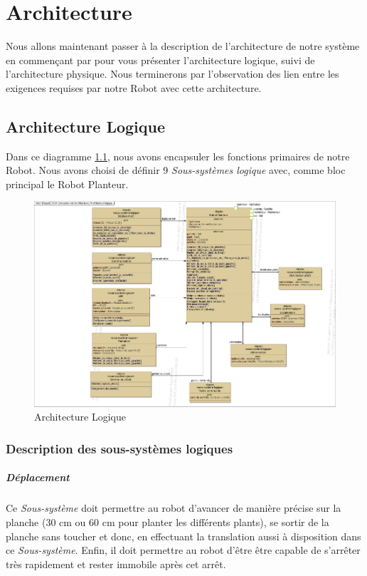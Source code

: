 \chapter{Architecture}
Nous allons maintenant passer à la description de l'architecture de notre système en commençant par pour vous présenter l’architecture logique, suivi de l'architecture physique. Nous terminerons par l'observation des lien entre les exigences requises par notre Robot avec cette architecture.

\section{Architecture Logique}
Dans ce diagramme \ref{fig:architectureLogique}, nous avons encapsuler les fonctions primaires de notre Robot. Nous avons choisi de définir 9 \emph{Sous-systèmes logique} avec, comme bloc principal le Robot Planteur.
\begin{figure}[!ht]
\centering
\includegraphics[width = \textwidth]{./III/images/SysML_Block_Definition_Diagram_3-CA_Conception_de_l_architecture_Architecture_logique.pdf}
\caption{Architecture Logique}\label{fig:architectureLogique}
\end{figure}
\subsection{Description des sous-systèmes logiques}
\paragraph*{Déplacement}
Ce \emph{Sous-système} doit permettre au robot d'avancer de manière précise sur la planche (30 cm ou 60 cm pour planter les différents plants), se sortir de la planche sans toucher et donc, en effectuant la translation aussi à disposition dans ce \emph{Sous-système}. Enfin, il doit permettre au robot d'être être capable de s'arrêter très rapidement et rester immobile après cet arrêt. 
